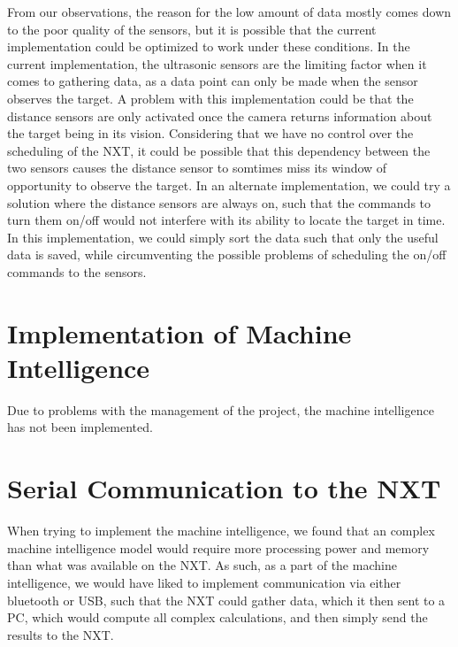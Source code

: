From our observations, the reason for the low amount of data mostly comes down
to the poor quality of the sensors, but it is possible that the current
implementation could be optimized to work under these conditions. In the current
implementation, the ultrasonic sensors are the limiting factor when it comes to
gathering data, as a data point can only be made when the sensor observes the
target.
A problem with this implementation could be that the distance sensors are only
activated once the camera returns information about the target being in its
vision. Considering that we have no control over the scheduling of the NXT, it
could be possible that this dependency between the two sensors causes the
distance sensor to somtimes miss its window of opportunity to observe the
target.
In an alternate implementation, we could try a solution where the distance
sensors are always on, such that the commands to turn them on/off would not
interfere with its ability to locate the target in time. In this implementation,
we could simply sort the data such that only the useful data is saved, while
circumventing the possible problems of scheduling the on/off commands to the
sensors.

\section{Implementation of Machine Intelligence}
Due to problems with the management of the project, the machine intelligence has
not been implemented.

\section{Serial Communication to the NXT}
When trying to implement the machine intelligence, we found that an complex
machine intelligence model would require more processing power and memory than
what was available on the NXT. As such, as a part of the machine intelligence,
we would have liked to implement communication via either bluetooth or USB, such
that the NXT could gather data, which it then sent to a PC, which would compute
all complex calculations, and then simply send the results to the NXT.

